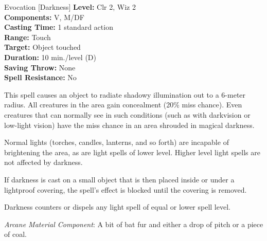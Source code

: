 {Evocation [Darkness]}
{
	\textbf{Level:}
	Clr 2, Wiz 2\\
	\textbf{Components:}
	V, M/DF\\
	\textbf{Casting Time:}
	1 standard action\\
	\textbf{Range:}
	Touch\\
	\textbf{Target:}
	Object touched\\
	\textbf{Duration:}
	10 min./level (D)\\
	\textbf{Saving Throw:}
	None\\
	\textbf{Spell Resistance:}
	No\\
}
{
	This spell causes an object to radiate shadowy illumination out to a 6-meter radius. All creatures in the area gain concealment (20\% miss chance). Even creatures that can normally see in such conditions (such as with darkvision or low-light vision) have the miss chance in an area shrouded in magical darkness.

	Normal lights (torches, candles, lanterns, and so forth) are incapable of brightening the area, as are light spells of lower level. Higher level light spells are not affected by darkness.

	If darkness is cast on a small object that is then placed inside or under a lightproof covering, the spell's effect is blocked until the covering is removed.

	Darkness counters or dispels any light spell of equal or lower spell level.

	\textit{Arcane Material Component}:
	A bit of bat fur and either a drop of pitch or a piece of coal.

}
